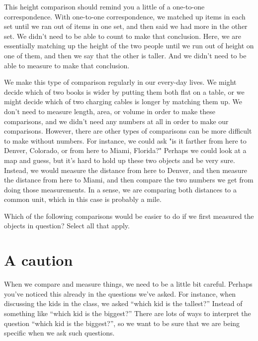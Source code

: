 \documentclass{ximera}
\begin{document}
This height comparison should remind you a little of a one-to-one correspondence. With one-to-one correspondence, we matched up items in each set until we ran out of items in one set, and then said we had more in the other set. We didn't need to be able to count to make that conclusion. Here, we are essentially matching up the height of the two people until we run out of height on one of them, and then we say that the other is taller. And we didn't need to be able to measure to make that conclusion.

We make this type of comparison regularly in our every-day lives. We might decide which of two books is wider by putting them both flat on a table, or we might decide which of two charging cables is longer by matching them up. We don't need to measure length, area, or volume in order to make these comparisons, and we didn't need any numbers at all in order to make our comparisons. However, there are other types of comparisons can be more difficult to make without numbers. For instance, we could ask "is it farther from here to Denver, Colorado, or from here to Miami, Florida?" Perhaps we could look at a map and guess, but it's hard to hold up these two objects and be very sure. Instead, we would measure the distance from here to Denver, and then measure the distance from here to Miami, and then compare the two numbers we get from doing those measurements. In a sense, we are comparing both distances to a common unit, which in this case is probably a mile.

\begin{question}
Which of the following comparisons would be easier to do if we first measured the objects in question? Select all that apply.
\begin{selectAll}
\end{selectAll}
\end{question}

\section{A caution}
When we compare and measure things, we need to be a little bit careful. Perhaps you've noticed this already in the questions we've asked. For instance, when discussing the kids in the class, we asked ``which kid is the tallest?'' Instead of something like ``which kid is the biggest?'' There are lots of ways to interpret the question ``which kid is the biggest?'', so we want to be sure that we are being specific when we ask such questions.
\end{document}
